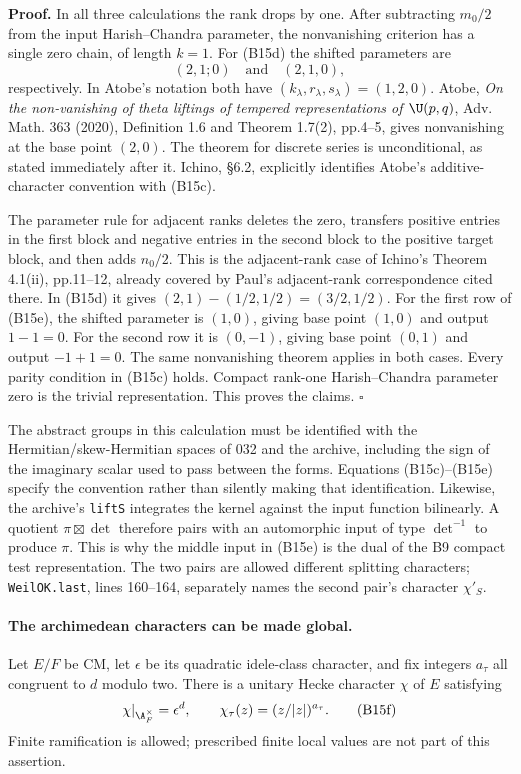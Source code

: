 \documentclass[11pt]{article}
\theoremstyle{definition}\newtheorem{definition}[theorem]{Definition}\newtheorem{remark}[theorem]{Remark}
\begin{document}
\textbf{Proof.}
In all three calculations the rank drops by one. After subtracting $m_0/2$ from the input Harish--Chandra parameter, the nonvanishing criterion has a single zero chain, of length $k=1$. For (B15d) the shifted parameters are
\[
 (2,1;0)\quad\text{and}\quad(2,1,0),
\]
respectively. In Atobe's notation both have $(k_\lambda,r_\lambda,s_\lambda)=(1,2,0)$. Atobe, \emph{On the non-vanishing of theta liftings of tempered representations of $\U(p,q)$}, Adv. Math. 363 (2020), Definition 1.6 and Theorem 1.7(2), pp.4--5, gives nonvanishing at the base point $(2,0)$. The theorem for discrete series is unconditional, as stated immediately after it. Ichino, \S6.2, explicitly identifies Atobe's additive-character convention with (B15c).

The parameter rule for adjacent ranks deletes the zero, transfers positive entries in the first block and negative entries in the second block to the positive target block, and then adds $n_0/2$. This is the adjacent-rank case of Ichino's Theorem 4.1(ii), pp.11--12, already covered by Paul's adjacent-rank correspondence cited there. In (B15d) it gives $(2,1)-(1/2,1/2)=(3/2,1/2)$. For the first row of (B15e), the shifted parameter is $(1,0)$, giving base point $(1,0)$ and output $1-1=0$. For the second row it is $(0,-1)$, giving base point $(0,1)$ and output $-1+1=0$. The same nonvanishing theorem applies in both cases. Every parity condition in (B15c) holds. Compact rank-one Harish--Chandra parameter zero is the trivial representation. This proves the claims. \hfill$\square$

The abstract groups in this calculation must be identified with the Hermitian/skew-Hermitian spaces of 032 and the archive, including the sign of the imaginary scalar used to pass between the forms. Equations (B15c)--(B15e) specify the convention rather than silently making that identification. Likewise, the archive's \texttt{liftS} integrates the kernel against the input function bilinearly. A quotient $\pi\boxtimes\det$ therefore pairs with an automorphic input of type $\det^{-1}$ to produce $\pi$. This is why the middle input in (B15e) is the dual of the B9 compact test representation. The two pairs are allowed different splitting characters; \texttt{WeilOK.last}, lines 160--164, separately names the second pair's character $\chi'_S$.

\paragraph{The archimedean characters can be made global.}
Let $E/F$ be CM, let $\epsilon$ be its quadratic idele-class character, and fix integers $a_\tau$ all congruent to $d$ modulo two. There is a unitary Hecke character $\chi$ of $E$ satisfying
\[
 \chi|_{\A_F^\times}=\epsilon^d,
 \qquad \chi_\tau(z)=(z/|z|)^{a_\tau}.
 \tag{B15f}
\]
Finite ramification is allowed; prescribed finite local values are not part of this assertion.
\end{document}
